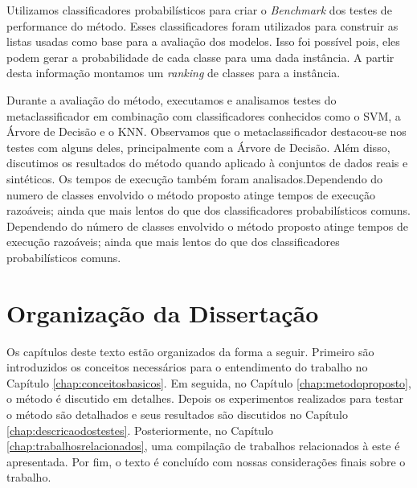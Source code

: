 Utilizamos classificadores probabilísticos para criar o \textit{Benchmark} dos testes de performance do método. 
Esses classificadores foram utilizados para construir as listas usadas como base para a avaliação dos modelos.
Isso foi possível pois, eles podem gerar a probabilidade de cada classe para uma dada instância.
A partir desta informação montamos um \textit{ranking} de classes para a instância.

Durante a avaliação do método, executamos e analisamos testes do metaclassificador em combinação com classificadores conhecidos como o SVM, a Árvore de Decisão e o KNN.
Observamos que o metaclassificador destacou-se nos testes com alguns deles, principalmente com a Árvore de Decisão.
Além disso, discutimos os resultados do método quando aplicado à conjuntos de dados reais e sintéticos.
Os tempos de execução também foram analisados.Dependendo do numero de classes envolvido o método proposto atinge tempos de execução razoáveis; ainda que mais lentos do que dos classificadores probabilísticos comuns.
Dependendo do número de classes envolvido o método proposto atinge tempos de execução razoáveis; ainda que mais lentos do que dos classificadores probabilísticos comuns.

\section{Organização da Dissertação}

Os capítulos deste texto estão organizados da forma a seguir.
Primeiro são introduzidos os conceitos necessários para o entendimento do trabalho no Capítulo \ref{chap:conceitosbasicos}.
Em seguida, no Capítulo \ref{chap:metodoproposto}, o método é discutido em detalhes.
Depois os experimentos realizados para testar o método são detalhados e seus resultados são discutidos no Capítulo \ref{chap:descricaodostestes}.
Posteriormente, no Capítulo \ref{chap:trabalhosrelacionados}, uma compilação de trabalhos relacionados à este é apresentada.
Por fim, o texto é concluído com nossas considerações finais sobre o trabalho.

